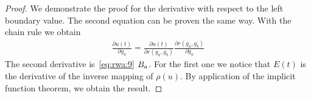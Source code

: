 \begin{proof}
  We demonstrate the proof for the derivative with respect to the left
  boundary value. The second equation can be proven the same way.
  With the chain rule we obtain
  \begin{gather*}
    \frac{\partial u(t)}{\partial g_a}
    = \frac{\partial u(t)}{\partial r(g_a,g_b)}
    \frac{\partial r(g_a,g_b)}{\partial g_a}
  \end{gather*}
  The second derivative is~\eqref{eq:rwa:9} $B_a$. For the first one
  we notice that $E(t)$ is the derivative of the inverse mapping of
  $\rho(u)$. By application of the implicit function theorem, we
  obtain the result.
\end{proof}





